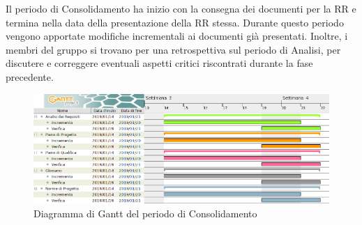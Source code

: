 Il periodo di Consolidamento ha inizio con la consegna dei documenti per la RR e termina nella data della presentazione della RR stessa. \newline
Durante questo periodo vengono apportate modifiche incrementali ai documenti già presentati. Inoltre, i membri del gruppo si trovano per una retrospettiva sul periodo di Analisi, per discutere e correggere eventuali aspetti critici riscontrati durante la fase precedente.
\begin{figure}[H]
	\includegraphics[width=1\linewidth]{Pianificazione/Consolidamento_Gantt.png}
	\caption{Diagramma di Gantt del periodo di Consolidamento}
\end{figure}